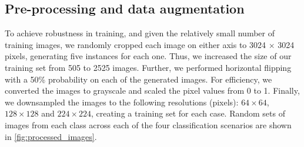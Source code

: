 \documentclass[Journal,letterpaper, SingleSpace, InsideFigs]{ascelike-new}
\begin{document}
\subsection{Pre-processing and data augmentation}
To achieve robustness in training, and given the relatively small number of training images, we randomly cropped each image on either axis to 3024 $\times$ 3024 pixels, generating five instances for each one. Thus, we increased the size of our training set from 505 to 2525 images. Further, we performed horizontal flipping with a 50\% probability on each of the generated images. For efficiency, we converted the images to grayscale and scaled the pixel values from 0 to 1. Finally, we downsampled the images to the following resolutions (pixels): $64 \times 64$, $128 \times 128$ and $224 \times 224$, creating a training set for each case. 
Random sets of images from each class across each of the four classification scenarios are shown in \autoref{fig:processed_images}.
\end{document}
